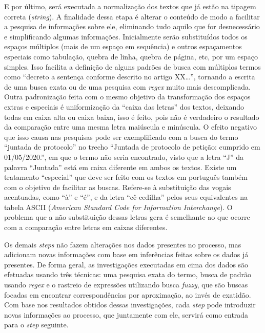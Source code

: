 E por último, será executada a normalização dos textos que já estão na tipagem correta (\textit{string}). A finalidade dessa etapa é alterar o conteúdo de modo a facilitar a pesquisa de informações sobre ele, eliminando tudo aquilo que for desnecessário e simplificando algumas informações. Inicialmente serão substituídos todos os espaços múltiplos (mais de um espaço em sequência) e outros espaçamentos especiais como tabulação, quebra de linha, quebra de página, etc, por um espaço simples. Isso facilita a definição de alguns padrões de busca com múltiplos termos como \enquote{decreto a sentença conforme descrito no artigo XX\dots}, tornando a escrita de uma busca exata ou de uma pesquisa com \textit{regex} muito mais descomplicada. Outra padronização feita com o mesmo objetivo da transformação dos espaços extras e especiais é uniformização da \enquote{caixa das letras} dos textos, deixando todas em caixa alta ou caixa baixa, isso é feito, pois não é verdadeiro o resultado da comparação entre uma mesma letra maiúscula e minúscula. O efeito negativo que isso causa nas pesquisas pode ser exemplificado com a busca do termo \enquote{juntada de protocolo} no trecho \enquote{Juntada de protocolo de petição: cumprido em 01/05/2020.}, em que o termo não seria encontrado, visto que a letra \enquote{J} da palavra \enquote{Juntada} está em caixa diferente em ambos os textos. Existe um tratamento \enquote{especial} que deve ser feito com os textos em português também com o objetivo de facilitar as buscas. Refere-se à substituição das vogais acentuadas, como \enquote{à} e \enquote{é}, e da letra \enquote{cê-cedilha} pelos seus equivalentes na tabela ASCII (\textit{American Standard Code for Information Interchange}). O problema que a não substituição dessas letras gera é semelhante ao que ocorre com a comparação entre letras em caixas diferentes.

Os demais \textit{steps} não fazem alterações nos dados presentes no processo, mas adicionam novas informações com base em inferências feitas sobre os dados já presentes. De forma geral, as investigações executadas em cima dos dados são efetuadas usando três técnicas: uma pesquisa exata do termo, busca de padrão usando \textit{regex} e o rastreio de expressões utilizando busca \textit{fuzzy}, que são buscas focadas em encontrar correspondências por aproximação, ao invés de exatidão. Com base nos resultados obtidos dessas investigações, cada \textit{step} pode introduzir novas informações ao processo, que juntamente com ele, servirá como entrada para o \textit{step} seguinte.

